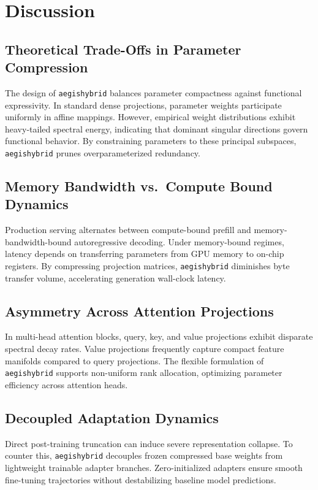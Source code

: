 \section{Discussion}

\subsection{Theoretical Trade-Offs in Parameter Compression}
The design of \texttt{aegishybrid} balances parameter compactness against functional expressivity. In standard dense projections, parameter weights participate uniformly in affine mappings. However, empirical weight distributions exhibit heavy-tailed spectral energy, indicating that dominant singular directions govern functional behavior. By constraining parameters to these principal subspaces, \texttt{aegishybrid} prunes overparameterized redundancy.

\subsection{Memory Bandwidth vs.\ Compute Bound Dynamics}
Production serving alternates between compute-bound prefill and memory-bandwidth-bound autoregressive decoding. Under memory-bound regimes, latency depends on transferring parameters from GPU memory to on-chip registers. By compressing projection matrices, \texttt{aegishybrid} diminishes byte transfer volume, accelerating generation wall-clock latency.

\subsection{Asymmetry Across Attention Projections}
In multi-head attention blocks, query, key, and value projections exhibit disparate spectral decay rates. Value projections frequently capture compact feature manifolds compared to query projections. The flexible formulation of \texttt{aegishybrid} supports non-uniform rank allocation, optimizing parameter efficiency across attention heads.

\subsection{Decoupled Adaptation Dynamics}
Direct post-training truncation can induce severe representation collapse. To counter this, \texttt{aegishybrid} decouples frozen compressed base weights from lightweight trainable adapter branches. Zero-initialized adapters ensure smooth fine-tuning trajectories without destabilizing baseline model predictions.

